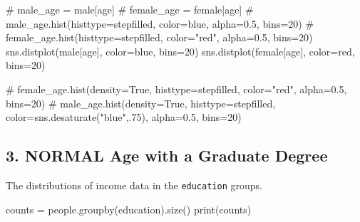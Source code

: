 \documentclass[
  letterpaper,
]{scrbook}
\newenvironment{Shaded}{\begin{snugshade}}{\end{snugshade}}
\newcommand{\BuiltInTok}[1]{\textcolor[rgb]{0.00,0.23,0.31}{#1}}
\newcommand{\CommentTok}[1]{\textcolor[rgb]{0.37,0.37,0.37}{#1}}
\newcommand{\DecValTok}[1]{\textcolor[rgb]{0.68,0.00,0.00}{#1}}
\newcommand{\NormalTok}[1]{\textcolor[rgb]{0.00,0.23,0.31}{#1}}
\newcommand{\OperatorTok}[1]{\textcolor[rgb]{0.37,0.37,0.37}{#1}}
\newcommand{\StringTok}[1]{\textcolor[rgb]{0.13,0.47,0.30}{#1}}
\begin{document}
\begin{Shaded}
\begin{Highlighting}[]
\CommentTok{\# male\_age = male[\textquotesingle{}age\textquotesingle{}]}
\CommentTok{\# female\_age = female[\textquotesingle{}age\textquotesingle{}]}
\CommentTok{\# male\_age.hist(histtype=\textquotesingle{}stepfilled\textquotesingle{}, color=\textquotesingle{}blue\textquotesingle{}, alpha=0.5, bins=20)}
\CommentTok{\# female\_age.hist(histtype=\textquotesingle{}stepfilled\textquotesingle{}, color="red", alpha=0.5, bins=20)}
\NormalTok{sns.distplot(male[}\StringTok{\textquotesingle{}age\textquotesingle{}}\NormalTok{], color}\OperatorTok{=}\StringTok{\textquotesingle{}blue\textquotesingle{}}\NormalTok{, bins}\OperatorTok{=}\DecValTok{20}\NormalTok{)}
\NormalTok{sns.distplot(female[}\StringTok{\textquotesingle{}age\textquotesingle{}}\NormalTok{], color}\OperatorTok{=}\StringTok{\textquotesingle{}red\textquotesingle{}}\NormalTok{, bins}\OperatorTok{=}\DecValTok{20}\NormalTok{)}
\end{Highlighting}
\end{Shaded}

\begin{Shaded}
\begin{Highlighting}[]
\CommentTok{\# female\_age.hist(density=True, histtype=\textquotesingle{}stepfilled\textquotesingle{}, color="red", alpha=0.5, bins=20)}
\CommentTok{\# male\_age.hist(density=True, histtype=\textquotesingle{}stepfilled\textquotesingle{}, color=sns.desaturate("blue",.75), alpha=0.5, bins=20)}
\end{Highlighting}
\end{Shaded}

\subsection*{3. NORMAL Age with a Graduate
Degree}\label{normal-age-with-a-graduate-degree}

The distributions of income data in the \texttt{education} groups.

\begin{Shaded}
\begin{Highlighting}[]
\NormalTok{counts }\OperatorTok{=}\NormalTok{ people.groupby(}\StringTok{\textquotesingle{}education\textquotesingle{}}\NormalTok{).size()}
\BuiltInTok{print}\NormalTok{(counts)}
\end{Highlighting}
\end{Shaded}
\end{document}
